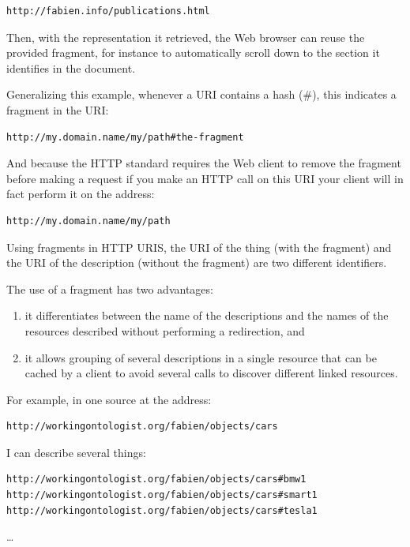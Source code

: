 \begin{lstlisting}
http://fabien.info/publications.html
\end{lstlisting}

Then, with the representation it retrieved, the Web browser can reuse
the provided fragment, for instance to automatically scroll down to the
section it identifies in the document.

Generalizing this example, whenever a URI contains a hash (\#), this
indicates a fragment in the URI:

\begin{lstlisting}
http://my.domain.name/my/path#the-fragment
\end{lstlisting}


And because the HTTP standard requires the Web client to remove the
fragment before making a request if you make an HTTP call on this URI
your client will in fact perform it on the address:

\begin{lstlisting}
http://my.domain.name/my/path
\end{lstlisting}


Using fragments in HTTP URIS, the URI of the thing (with the fragment)
and the URI of the description (without the fragment) are two different
identifiers.

The use of a fragment has two advantages:

\begin{enumerate}
\def\labelenumi{\arabic{enumi}.}
\item
  it differentiates between the name of the descriptions and the
  names of the resources described without performing a redirection, and
\item
  it allows grouping of several descriptions in a single resource that can be
  cached by a client to avoid several calls to discover different linked resources.
\end{enumerate}

For example, in one source at the address:

\begin{lstlisting}
http://workingontologist.org/fabien/objects/cars
\end{lstlisting}


I can describe several things:


\begin{lstlisting}
http://workingontologist.org/fabien/objects/cars#bmw1
http://workingontologist.org/fabien/objects/cars#smart1
http://workingontologist.org/fabien/objects/cars#tesla1
\end{lstlisting}
\ldots{} 

